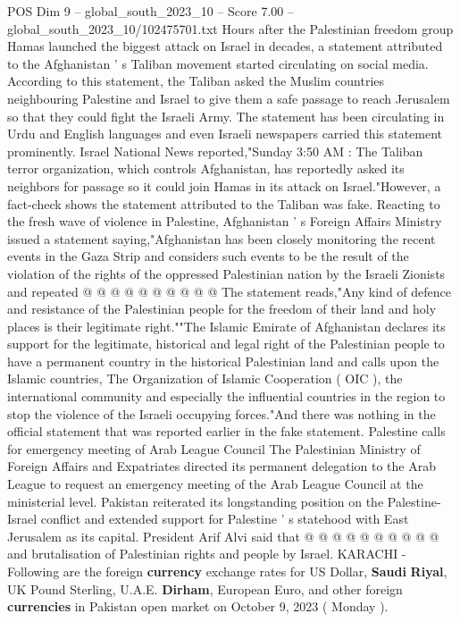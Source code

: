 \begin{textsample}{POS Dim 9 – global\_south\_2023\_10 – Score 7.00 – global\_south\_2023\_10/102475701.txt}  \label{ex:f9_pos_077}
Hours after the Palestinian freedom group Hamas launched the biggest attack on Israel in decades, a statement attributed to the Afghanistan ' s Taliban movement started circulating on social media.
According to this statement, the Taliban asked the Muslim countries neighbouring Palestine and Israel to give them a safe passage to reach Jerusalem so that they could fight the Israeli Army.
The statement has been circulating in Urdu and English languages and even Israeli newspapers carried this statement prominently.
Israel National News reported,"Sunday 3:50 AM : The Taliban terror organization, which controls Afghanistan, has reportedly asked its neighbors for passage so it could join Hamas in its attack on Israel."However, a fact-check shows the statement attributed to the Taliban was fake.
Reacting to the fresh wave of violence in Palestine, Afghanistan ' s Foreign Affairs Ministry issued a statement saying,"Afghanistan has been closely monitoring the recent events in the Gaza Strip and considers such events to be the result of the violation of the rights of the oppressed Palestinian nation by the Israeli Zionists and repeated @ @ @ @ @ @ @ @ @ @ The statement reads,"Any kind of defence and resistance of the Palestinian people for the freedom of their land and holy places is their legitimate right.""The Islamic Emirate of Afghanistan declares its support for the legitimate, historical and legal right of the Palestinian people to have a permanent country in the historical Palestinian land and calls upon the Islamic countries, The Organization of Islamic Cooperation ( OIC ), the international community and especially the influential countries in the region to stop the violence of the Israeli occupying forces."And there was nothing in the official statement that was reported earlier in the fake statement.
Palestine calls for emergency meeting of Arab League Council The Palestinian Ministry of Foreign Affairs and Expatriates directed its permanent delegation to the Arab League to request an emergency meeting of the Arab League Council at the ministerial level.
Pakistan reiterated its longstanding position on the Palestine-Israel conflict and extended support for Palestine ' s statehood with East Jerusalem as its capital.
President Arif Alvi said that @ @ @ @ @ @ @ @ @ @ and brutalisation of Palestinian rights and people by Israel.
KARACHI - Following are the foreign \textbf{currency} exchange rates for US Dollar, \textbf{Saudi} \textbf{Riyal}, UK Pound Sterling, U.A.E. \textbf{Dirham}, European Euro, and other foreign \textbf{currencies} in Pakistan open market on October 9, 2023 ( Monday ).

\end{textsample}
